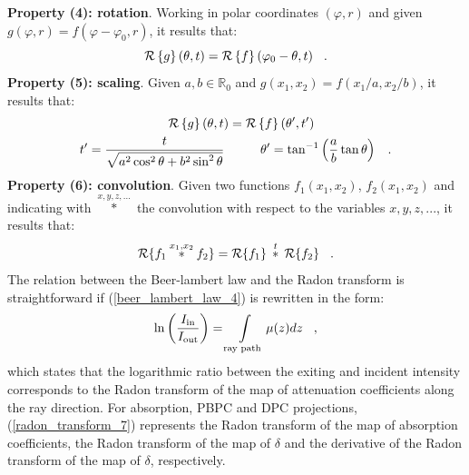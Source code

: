 {{\bf Property (4): rotation}. Working in polar coordinates $(\varphi,r)$ and given $g(\varphi,r) = f(\varphi-\varphi_{0},r)$,
it results that:
\begin{equation}
  \operatorname{\mathcal{R}}\left\{g\right\}(\theta,t) = \operatorname{\mathcal{R}}\left\{f\right\}(\varphi_{0}-\theta,t) \hspace{0.3cm}.
  \label{radon_transform_5}
\end{equation}
\newline\newline
{\bf Property (5): scaling}. Given $a, b \in \mathbb{R}_{0}$ and $g(x_{1},x_{2}) = f(x_{1}/a,x_{2}/b)$,
it results that:
\begin{equation}
  \begin{split}
    & \hspace*{2.4cm}\operatorname{\mathcal{R}}\left\{g\right\}(\theta,t) = \operatorname{\mathcal{R}}\left\{f\right\}(\theta',t') \\
    & t' = \frac{t}{\sqrt{a^{2}\cos^{2}\theta + b^{2}\sin^{2}\theta}} \hspace*{1cm} \theta' = \tan^{-1}\left(\frac{a}{b}\tan\theta\right) \hspace{0.3cm}.
  \end{split}
  \label{radon_transform_5}
\end{equation}
\newline\newline
{\bf Property (6): convolution}. Given two functions $f_{1}(x_{1},x_{2})$, $f_{2}(x_{1},x_{2})$
and indicating with $\overset{x,y,z,...}{\ast}$ the convolution with respect to the variables $x, y, z, ...$, it results that:
\begin{equation}
  \operatorname{\mathcal{R}}\{f_{1} \overset{x_{1},x_{2}}{\ast} f_{2} \} = \operatorname{\mathcal{R}}\{f_{1}\}  \: \overset{t}{\ast} \: \operatorname{\mathcal{R}}\{f_{2}\} \hspace{0.3cm}.  
  \label{radon_transform_6}
\end{equation}
\newline\newline
The relation between the Beer-lambert law and the Radon transform is straightforward if (\ref{beer_lambert_law_4}) is rewritten in the form:
\begin{equation}
   \ln\left(\frac{I_{\text{in}}}{I_{\text{out}}}\right) = \int\limits_{\text{ray path}}\mu(z)dz \hspace{0.3cm}, 
   \label{radon_transform_7}
\end{equation}
which states that the logarithmic ratio between the exiting and incident intensity corresponds to the Radon transform of the map
of attenuation coefficients along the ray direction. For absorption, PBPC and DPC projections, (\ref{radon_transform_7}) represents the Radon transform
of the map of absorption coefficients, the Radon transform of the map of $\delta$ and the derivative of the Radon transform of the map of $\delta$,
respectively.


}
